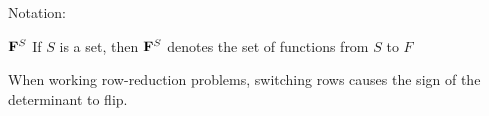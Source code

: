 Notation:

${\bf F}^S$ If $S$ is a set, then ${\bf F}^S$ denotes the set of functions from $S$ to $F$

When working row-reduction problems, switching rows causes the sign of the determinant to flip.

